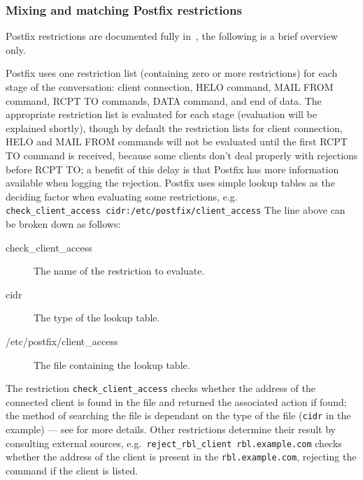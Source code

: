 \documentclass[a4paper,12pt,draft]{article}
\newcommand{\tab}[0]{%
    \hspace*{2em}%
}
\begin{document}
\subsubsection{Mixing and matching Postfix restrictions}

Postfix restrictions are documented fully in~\cite{smtpd_access_readme,
smtpd_per_user_control, policy-servers}, the following is a brief overview
only.

Postfix uses one restriction list (containing zero or more restrictions)
for each stage of the \SMTP{} conversation: client connection, HELO
command, MAIL FROM command, RCPT TO commands, DATA command, and end of
data.  The appropriate restriction list is evaluated for each stage
(evaluation will be explained shortly), though by default the restriction
lists for client connection, HELO and MAIL FROM commands will not be
evaluated until the first RCPT TO command is received, because some clients
don't deal properly with rejections before RCPT TO\@; a benefit of this
delay is that Postfix has more information available when logging the
rejection.  Postfix uses simple lookup tables as the deciding factor when
evaluating some restrictions, e.g.\newline
\tab{}\texttt{check\_client\_access~cidr:/etc/postfix/client\_access}
\newline The line above can be broken down as follows:

\begin{description}

    \item [check\_client\_access] The name of the restriction to evaluate.

    \item [cidr] The type of the lookup table.

    \item [/etc/postfix/client\_access] The file containing the lookup
        table.

\end{description}

The restriction \texttt{check\_client\_access} checks whether the \IP{}
address of the connected client is found in the file and returned the
associated action if found; the method of searching the file is dependant
on the type of the file (\texttt{cidr} in the example) --- see
\cite{postfix-lookup-tables} for more details.  Other restrictions
determine their result by consulting external sources, e.g.\
\texttt{reject\_rbl\_client rbl.example.com} checks whether the \IP{}
address of the client is present in the \RBL{} \texttt{rbl.example.com},
rejecting the command if the client is listed.
\end{document}
